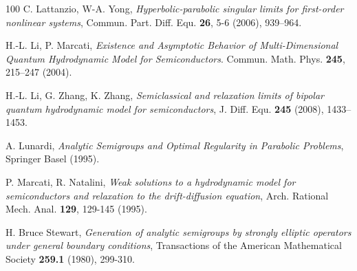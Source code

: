 \documentclass[english]{amsart}
\theoremstyle{plain}
\theoremstyle{definition}
\theoremstyle{remark}
\theoremstyle{plain}
\theoremstyle{plain}
\theoremstyle{plain}
\numberwithin{equation}{section}
\begin{document}
\begin{thebibliography}{100}
 C. Lattanzio, W-A. Yong, \emph{Hyperbolic-parabolic singular limits for first-order nonlinear systems}, Commun. Part. Diff. Equ. {\bf 26}, 5-6 (2006), 939--964.

 H.-L. Li, P. Marcati, \emph{Existence and Asymptotic Behavior of Multi-Dimensional Quantum Hydrodynamic Model for Semiconductors}. Commun. Math. Phys. {\bf 245}, 215–247 (2004).

 H.-L. Li, G. Zhang, K. Zhang, \emph{Semiclassical and relaxation limits of bipolar quantum hydrodynamic model for semiconductors}, J. Diff. Equ. {\bf 245} (2008), 1433–1453.

 A. Lunardi, \emph{Analytic Semigroups and Optimal Regularity in Parabolic Problems}, Springer Basel (1995).


 P. Marcati, R. Natalini, \emph{Weak solutions to a hydrodynamic model for semiconductors and relaxation to the drift-diffusion equation}, Arch. Rational Mech. Anal. {\bf 129}, 129-145 (1995).





 H. Bruce Stewart, \emph{Generation of analytic semigroups by strongly elliptic operators under general boundary conditions}, Transactions of the American Mathematical Society {\bf 259.1} (1980), 299-310.



\end{thebibliography}
\end{document}
